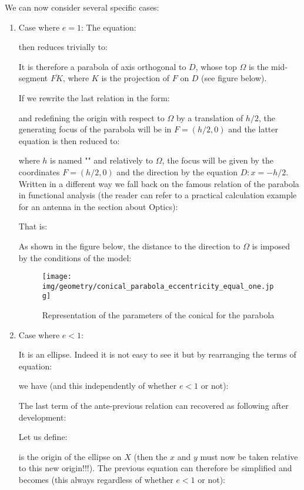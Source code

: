 	We can now consider several specific cases:
	\begin{enumerate}
		\item Case where $e=1$:
		The equation:
		
		then reduces trivially to:
		
		It is therefore a parabola of axis orthogonal to $D$, whose top $\Omega$ is the mid-segment $\overline{FK}$, where $K$ is the projection of $F$ on $D$ (see figure below).
		
		If we rewrite the last relation in the form:
		
		and redefining the origin with respect to $\Omega$ by a translation of $h/2$, the generating focus of the parabola will be in $F=(h/2,0)$ and the latter equation is then reduced to:
		
		where $h$ is named "" and relatively to $\Omega$, the focus will be given by the coordinates $F=(h/2,0)$ and the direction by the equation $D:x=-h/2$. Written in a different way we fall back on the famous relation of the parabola in functional analysis (the reader can refer to a practical calculation example for an antenna in the section about Optics):
		
		That is:
		
		As shown in the figure below, the distance to the direction to $\Omega$ is imposed by the conditions of the model:
		\begin{figure}[H]
			\centering
			\texttt{[image: img/geometry/conical\_parabola\_eccentricity\_equal\_one.jpg]}
			\caption{Representation of the parameters of the conical for the parabola}
		\end{figure}
	
		\item Case where $e<1$:
		
		It is an ellipse. Indeed it is not easy to see it but by rearranging the terms of equation:
		
		we have (and this independently of whether $e<1$ or not):
		
		The last term of the ante-previous relation can recovered as following after development:
		
		Let us define:
		
		is the origin of the ellipse on $X$ (then the $x$ and $y$ must now be taken relative to this new origin!!!). The previous equation can therefore be simplified and becomes (this always regardless of whether $e<1$ or not):
		

\end{enumerate}
